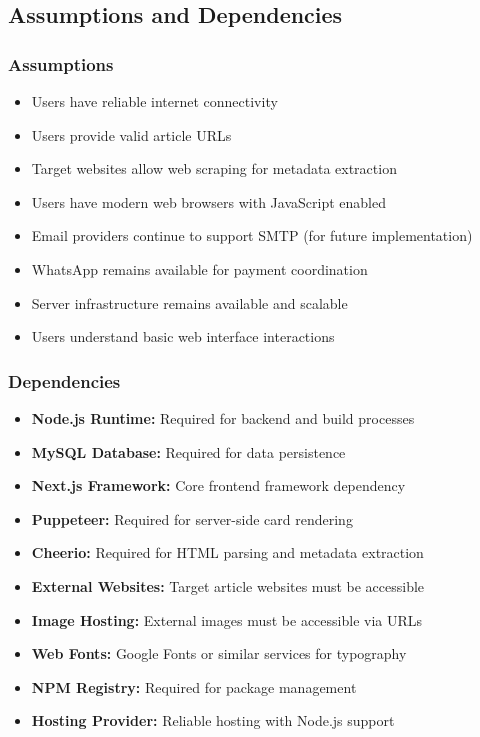 \documentclass[12pt,a4paper]{article}
\begin{document}
\subsection{Assumptions and Dependencies}

\subsubsection{Assumptions}
\begin{itemize}
    \item Users have reliable internet connectivity
    \item Users provide valid article URLs
    \item Target websites allow web scraping for metadata extraction
    \item Users have modern web browsers with JavaScript enabled
    \item Email providers continue to support SMTP (for future implementation)
    \item WhatsApp remains available for payment coordination
    \item Server infrastructure remains available and scalable
    \item Users understand basic web interface interactions
\end{itemize}

\subsubsection{Dependencies}
\begin{itemize}
    \item \textbf{Node.js Runtime:} Required for backend and build processes
    \item \textbf{MySQL Database:} Required for data persistence
    \item \textbf{Next.js Framework:} Core frontend framework dependency
    \item \textbf{Puppeteer:} Required for server-side card rendering
    \item \textbf{Cheerio:} Required for HTML parsing and metadata extraction
    \item \textbf{External Websites:} Target article websites must be accessible
    \item \textbf{Image Hosting:} External images must be accessible via URLs
    \item \textbf{Web Fonts:} Google Fonts or similar services for typography
    \item \textbf{NPM Registry:} Required for package management
    \item \textbf{Hosting Provider:} Reliable hosting with Node.js support
\end{itemize}
\end{document}
